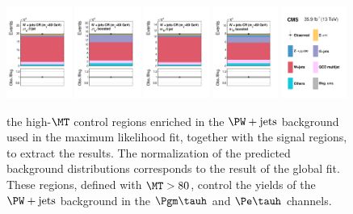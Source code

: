 \begin{figure}[!htbp]
\centering
     \includegraphics[width=0.19\textwidth]{higgs_to_taus/plots/Figure_002-a.pdf}
     \includegraphics[width=0.19\textwidth]{higgs_to_taus/plots/Figure_002-b.pdf}
     \includegraphics[width=0.19\textwidth]{higgs_to_taus/plots/Figure_002-c.pdf}
     \includegraphics[width=0.19\textwidth]{higgs_to_taus/plots/Figure_002-d.pdf}
     \includegraphics[width=0.19\textwidth]{higgs_to_taus/plots/Figure_002-e.pdf}
     \caption{the high-$\MT$ control regions enriched in the $\PW+\text{jets}$ background used in 
the maximum likelihood fit, together with the signal regions, to extract the results. 
The normalization of the predicted background distributions corresponds to the result of 
the global fit. These regions, defined with $\MT>80$\GeV, control the yields of the 
$\PW+\text{jets}$ background in the $\Pgm\tauh$ and $\Pe\tauh$ channels.  
}
     \label{fig:htt_wj_CR1}
\end{figure}


